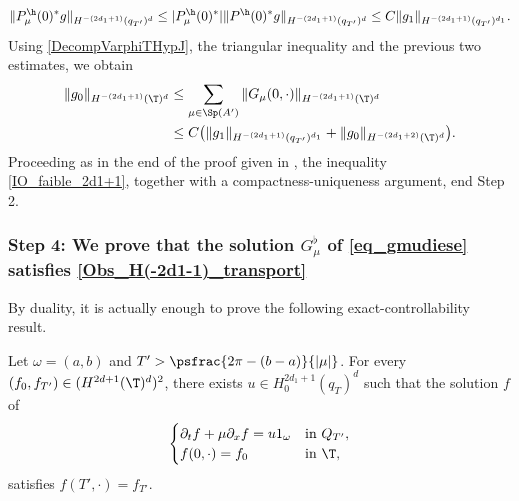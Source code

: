 \[
\| P^\h_\mu(0)^* g \|_{H^{-(2d_1+1)}(q_{T'})^d}
\leq |P^\h_\mu(0)^*| \| P^\h(0)^* g \|_{H^{-(2d_1+1)}(q_{T'})^d} \leq C \|g_1\|_{H^{-(2d_1+1)}(q_{T'})^{d_1}}.
\]
Using \eqref{DecompVarphiTHypJ}, the triangular inequality and the previous two estimates, we obtain
\begin{equation}
\begin{split}
\|g_0\|_{H^{-(2d_1+1)}(\T)^d}
& \leq \sum_{\mu \in \Sp(A')} \|G_\mu(0,\cdot)\|_{H^{-(2d_1+1)}(\T)^d}\\
&\leq C \bigl(\|g_1\|_{H^{-(2d_1+1)}(q_{T'})^{d_1}} + \| g_0\|_{H^{-(2d_1+2)}(\T)^d} \bigr).
\label{IO_faible_2d1+1}
\end{split}
\end{equation}
Proceeding as in the end of the proof given in , the inequality \eqref{IO_faible_2d1+1}, together with a compactness-uniqueness argument, end Step 2.

\subsubsection*{Step 4: We prove that the solution $G_\mu^\flat$ of \eqref{eq_gmudiese} satisfies \eqref{Obs_H(-2d1-1)_transport}}
By duality, it is actually enough to prove the following exact-controllability result.
\begin{prop}
\label{PropExactControllabilityResultTransport}
Let $\omega = (a,b)$ and $T' > \psfrac{2 \pi -(b-a)}{|\mu|}$. For every $(f_0, f_{T'}) \in (H^{2d+1}(\T)^{d})^2$, there exists $u \in H_0^{2d_1+1}(q_T)^{d}$ such that the solution $f$ of
\begin{equation}
\label{SystAdjSAsympBis}
\begin{cases}
\partial_t f + \mu \partial_x f = u 1_{\omega} &\text{in}\ Q_{T'},\\
f(0,\cdot)=f_{0}& \text{in}\ \T,
\end{cases}
\end{equation}
satisfies $f(T',\cdot)=f_{T'}$.
\end{prop}

